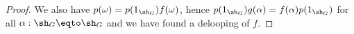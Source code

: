 \begin{proof}
We also have $p(\omega) = p(1_{\sh_G})f(\omega)$, hence
$p(1_{\sh_G})g(\alpha) =  f(\alpha)p(1_{\sh_G})$
for all $\alpha:\sh_G\eqto \sh_G$ and we have found a delooping of $f$.











\end{proof}


